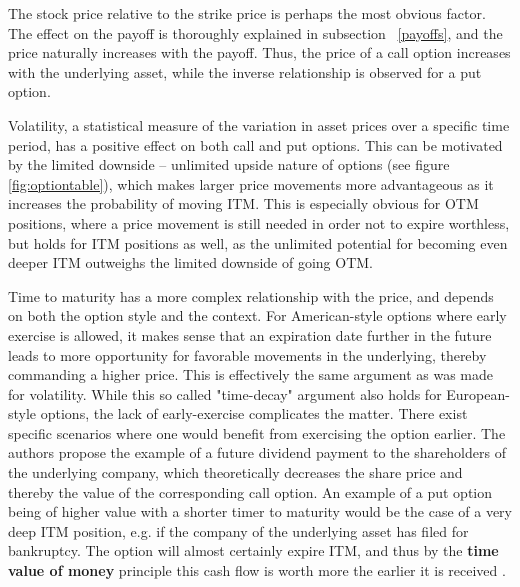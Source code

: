 \documentclass[english,12pt,a4paper,pdftex,sci,utf8]{aaltothesis}
\begin{document}
The stock price relative to the strike price is perhaps the most obvious factor. The effect on the payoff is thoroughly explained in subsection ~\ref{payoffs}, and the price naturally increases with the payoff. Thus, the price of a call option increases with the underlying asset, while the inverse relationship is observed for a put option.

Volatility, a statistical measure of the variation in asset prices over a specific time period, has a positive effect on both call and put options. This can be motivated by the limited downside -- unlimited upside nature of options (see figure \ref{fig:optiontable}), which makes larger price movements more advantageous as it increases the probability of moving ITM. This is especially obvious for OTM positions, where a price movement is still needed in order not to expire worthless, but holds for ITM positions as well, as the unlimited potential for becoming even deeper ITM outweighs the limited downside of going OTM.

Time to maturity has a more complex relationship with the price, and depends on both the option style and the context. For American-style options where early exercise is allowed, it makes sense that an expiration date further in the future leads to more opportunity for favorable movements in the underlying, thereby commanding a higher price. This is effectively the same argument as was made for volatility. While this so called "time-decay" argument also holds for European-style options, the lack of early-exercise complicates the matter. There exist specific scenarios where one would benefit from exercising the option earlier. The authors propose the example of a future dividend payment to the shareholders of the underlying company, which theoretically decreases the share price and thereby the value of the corresponding call option. An example of a put option being of higher value with a shorter timer to maturity would be the case of a very deep ITM position, e.g. if the company of the underlying asset has filed for bankruptcy. The option will almost certainly expire ITM, and thus by the \textbf{time value of money} principle this cash flow is worth more the earlier it is received \cite[pp. 97-101]{berk2007corporate}.
\end{document}
